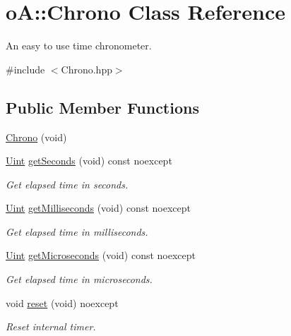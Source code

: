 \hypertarget{classo_a_1_1_chrono}{}\section{oA\+:\+:Chrono Class Reference}
\label{classo_a_1_1_chrono}


An easy to use time chronometer.  




{\ttfamily \#include $<$Chrono.\+hpp$>$}

\subsection*{Public Member Functions}
\begin{DoxyCompactItemize}
\item 
\mbox{\hyperlink{classo_a_1_1_chrono_aec5a69450af4387e5d1b2b2344dc2bcd}{Chrono}} (void)
\item 
\mbox{\hyperlink{namespaceo_a_abe1d8250226c5cf34f84d7b75fc7922e}{Uint}} \mbox{\hyperlink{classo_a_1_1_chrono_a41692d0d58ca6cfc3570d1b2169b4a96}{get\+Seconds}} (void) const noexcept
\begin{DoxyCompactList}\small\item\em Get elapsed time in seconds. \end{DoxyCompactList}\item 
\mbox{\hyperlink{namespaceo_a_abe1d8250226c5cf34f84d7b75fc7922e}{Uint}} \mbox{\hyperlink{classo_a_1_1_chrono_ad77117d4c523970030eda4cec93add7c}{get\+Milliseconds}} (void) const noexcept
\begin{DoxyCompactList}\small\item\em Get elapsed time in milliseconds. \end{DoxyCompactList}\item 
\mbox{\hyperlink{namespaceo_a_abe1d8250226c5cf34f84d7b75fc7922e}{Uint}} \mbox{\hyperlink{classo_a_1_1_chrono_ac5ed210f5be9e507c95940356338bd88}{get\+Microseconds}} (void) const noexcept
\begin{DoxyCompactList}\small\item\em Get elapsed time in microseconds. \end{DoxyCompactList}\item 
void \mbox{\hyperlink{classo_a_1_1_chrono_a16943e5e5a0a768cd5b1a7af2deed739}{reset}} (void) noexcept
\begin{DoxyCompactList}\small\item\em Reset internal timer. \end{DoxyCompactList}\item 

\end{DoxyCompactItemize}
